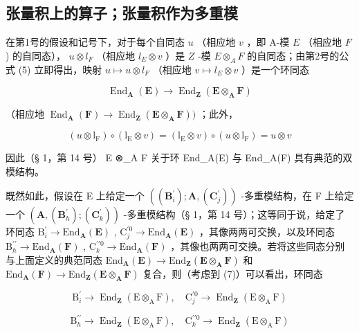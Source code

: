 \subsection{张量积上的算子；张量积作为多重模}

在第1号的假设和记号下，对于每个自同态 \(u\) （相应地 \(v\) ，即 A-模 \(E\) （相应地 \(F\) ) 的自同态）， \(u \otimes l_F\) （相应地 \(l_E \otimes v\) ）是 \(Z\) -模 \(E \otimes_A F\) 的自同态；由第2号的公式 (5) 立即得出，映射 \(u \mapsto u \otimes l_F\) （相应地 \(v \mapsto l_E \otimes v\) ）是一个环同态

\[
\operatorname{End} _ {\mathbf {A}} (\mathbf {E}) \rightarrow \operatorname{End} _ {\mathbf {Z}} (\mathbf {E} \otimes_ {\mathbf {A}} \mathbf {F})
\]

（相应地 \(\operatorname{End}_{\mathbf{A}}(\mathbf{F}) \to \operatorname{End}_{\mathbf{Z}}(\mathbf{E} \otimes_{\mathbf{A}} \mathbf{F}))\) ；此外，

\[
(u \otimes \mathrm{l} _ {\mathrm{F}}) \circ (\mathrm{l} _ {\mathrm{E}} \otimes v) = (\mathrm{l} _ {\mathrm{E}} \otimes v) \circ (u \otimes \mathrm{l} _ {\mathrm{F}}) = u \otimes v\tag{7}
\]

因此（§ 1，第 14 号） E ⊗\_A F 关于环 End\_A(E) 与 End\_A(F) 具有典范的双模结构。

既然如此，假设在 E 上给定一个 \(((\mathbf{B}_i^{\prime});\mathbf{A},(\mathbf{C}_j^{\prime}))\) -多重模结构，在 F 上给定一个 \((\mathbf{A},(\mathbf{B}_h^{\prime});(\mathbf{C}_k^{\prime}))\) -多重模结构（§ 1，第 14 号）；这等同于说，给定了环同态 \(\mathrm{B}_i^\prime \to \mathrm{End}_{\mathbf{A}}(\mathbf{E})\) , \(\mathrm{C}_j^{\prime 0} \to \mathrm{End}_{\mathbf{A}}(\mathbf{E})\) ，其像两两可交换，以及环同态 \(\mathrm{B}_h^{\prime \prime} \to \mathrm{End}_{\mathbf{A}}(\mathbf{F})\) , \(\mathrm{C}_k^{\prime \prime 0} \to \mathrm{End}_{\mathbf{A}}(\mathbf{F})\) ，其像也两两可交换。若将这些同态分别与上面定义的典范同态 \(\mathrm{End}_{\mathbf{A}}(\mathbf{E}) \to \mathrm{End}_{\mathbf{Z}}(\mathbf{E} \otimes_{\mathbf{A}} \mathbf{F})\) 和 \(\mathrm{End}_{\mathbf{A}}(\mathbf{F}) \to \mathrm{End}_{\mathbf{Z}}(\mathbf{E} \otimes_{\mathbf{A}} \mathbf{F})\) 复合，则（考虑到 (7)）可以看出，环同态

\[
\mathrm{B} _ {i} ^ {\prime} \rightarrow \operatorname{End} _ {\mathbf {Z}} (\mathrm{E} \otimes_ {\mathrm{A}} \mathrm{F}), \quad \mathrm{C} _ {j} ^ {\prime 0} \rightarrow \operatorname{End} _ {\mathbf {Z}} (\mathrm{E} \otimes_ {\mathrm{A}} \mathrm{F})
\]

\[
\mathrm{B} _ {h} ^ {\prime \prime} \rightarrow \operatorname{End} _ {\mathbf {Z}} (\mathrm{E} \otimes_ {\mathrm{A}} \mathrm{F}), \quad \mathrm{C} _ {k} ^ {\prime \prime 0} \rightarrow \operatorname{End} _ {\mathbf {Z}} (\mathrm{E} \otimes_ {\mathrm{A}} \mathrm{F})
\]

